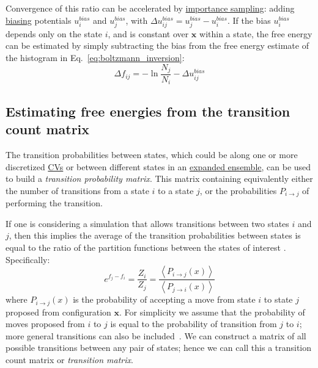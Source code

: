 \documentclass[9pt,review]{livecoms}
\newcommand{\vx}{\mathbf{x}}
\begin{document}
Convergence of this ratio can be accelerated by \hyperlink{ref:IS} {importance sampling}: adding \hyperlink{ref:biasingE} {biasing} potentials $u^{bias}_i$ and $u^{bias}_j$, with $\Delta u^{bias}_{ij}=u^{bias}_j - u^{bias}_i$.
If the bias $u^{bias}_i$ depends only on the state $i$, and is constant over $\vx$ within a state, the free energy can be estimated by simply subtracting the bias from the free energy estimate of the histogram in Eq.~\ref{eq:boltzmann_inversion}: \begin{equation}
\Delta f_{ij} = -\ln \frac{N_j}{N_i} - \Delta u^{bias}_{ij}
\label{eq:boltzmann_inversion_biased}
\end{equation}

\subsection{Estimating free energies from the transition count matrix\label{sec:transtion_matrix}}

The transition probabilities between states, which could be along one or more discretized \hyperlink{ref:CV} {CVs} or between different states in an \hyperlink{ref:ExpEns}{expanded ensemble}, can be used to build a \textit{transition probability matrix}. This matrix containing equivalently either the number of transitions from a state $i$ to a state $j$, or the probabilities $P_{i\rightarrow j}$ of performing the transition.

If one is considering a simulation that allows transitions between two states $i$ and $j$, then this implies the average of the transition probabilities between states is equal to the ratio of the partition functions between the states of interest \cite{deOliveira:EPJB:1998,Wang:JoSP:2002,escobedo_transition_2006}. Specifically:
\begin{equation}
e^{f_j-f_i} = \frac{Z_i}{Z_j} = \frac{\left \langle  P_{i\rightarrow j}(x)\right\rangle}{\left \langle P_{j\rightarrow i}(x) \right \rangle}
\end{equation}
where $P_{i\rightarrow j}(x)$ is the probability of accepting a move from state $i$ to state $j$ proposed from configuration $\vx$. For simplicity we assume that the probability of moves proposed from $i$ to $j$ is equal to the probability of transition from $j$ to $i$; more general transitions can also be included~\cite{escobedo_transition_2006}. We can construct a matrix of all possible transitions between any pair of states; hence we can call this a transition count matrix or \textit{transition matrix}.
\end{document}
